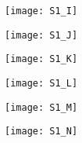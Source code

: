 \documentclass[../DISSERTACAO_MAIN.tex]{subfiles}
\begin{document}
\begin{figure}\ContinuedFloat
	\begin{subfigure}[t]{\linewidth}
		\centering
		\texttt{[image: S1\_I]}
		\caption{}
	\end{subfigure}
	\begin{subfigure}[t]{\linewidth}
		\centering
		\texttt{[image: S1\_J]}
		\caption{}
	\end{subfigure}
	\begin{subfigure}[t]{\linewidth}
		\centering
		\texttt{[image: S1\_K]}
		\caption{}
	\end{subfigure}	
	\begin{subfigure}[t]{\linewidth}
		\centering
		\texttt{[image: S1\_L]}
		\caption{}		
	\end{subfigure}
	\begin{subfigure}[t]{\linewidth}
		\centering
		\texttt{[image: S1\_M]}
		\caption{}
	\end{subfigure}
	\begin{subfigure}[t]{\linewidth}
		\centering
		\texttt{[image: S1\_N]}
		\caption{}
	\end{subfigure}
\end{figure}	
	
	\newpage
	
\end{document}
